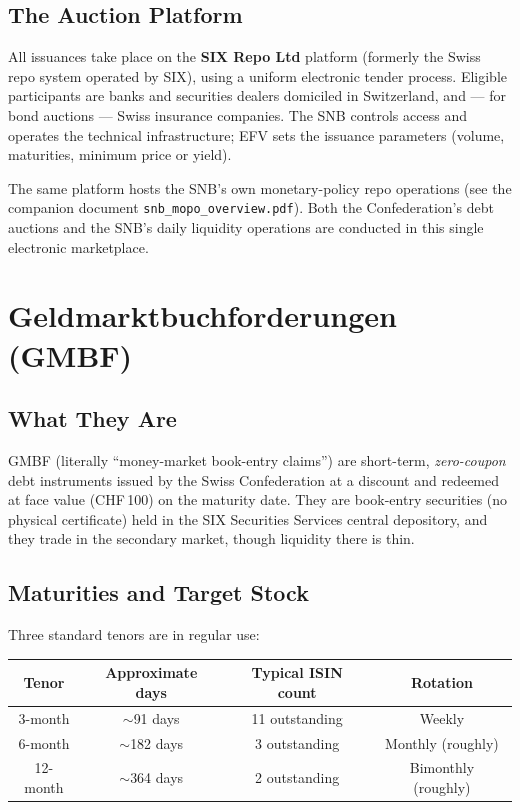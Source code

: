 \documentclass[12pt,a4paper]{article}
\begin{document}
\subsection{The Auction Platform}

All issuances take place on the \textbf{SIX Repo Ltd} platform (formerly the
Swiss repo system operated by SIX), using a uniform electronic tender
process.  Eligible participants are banks and securities dealers domiciled in
Switzerland, and --- for bond auctions --- Swiss insurance companies.  The SNB
controls access and operates the technical infrastructure; EFV sets the
issuance parameters (volume, maturities, minimum price or yield).

\medskip
\noindent The same platform hosts the SNB's own monetary-policy repo operations
(see the companion document \texttt{snb\_mopo\_overview.pdf}).  Both the
Confederation's debt auctions and the SNB's daily liquidity operations are
conducted in this single electronic marketplace.

\section{Geldmarktbuchforderungen (GMBF)}

\subsection{What They Are}

GMBF (literally ``money-market book-entry claims'') are short-term, \emph{zero-coupon}
debt instruments issued by the Swiss Confederation at a discount and redeemed
at face value (CHF\,100) on the maturity date.  They are
book-entry securities (no physical certificate) held in the SIX Securities
Services central depository, and they trade in the secondary market, though
liquidity there is thin.

\subsection{Maturities and Target Stock}

Three standard tenors are in regular use:

\begin{center}
\begin{tabular}{cccc}
  \toprule
  Tenor & Approximate days & Typical ISIN count & Rotation \\
  \midrule
  3-month  & $\sim$91 days  & 11 outstanding & Weekly \\
  6-month  & $\sim$182 days &  3 outstanding & Monthly (roughly) \\
  12-month & $\sim$364 days &  2 outstanding & Bimonthly (roughly) \\
  \bottomrule
\end{tabular}
\end{center}
\end{document}
